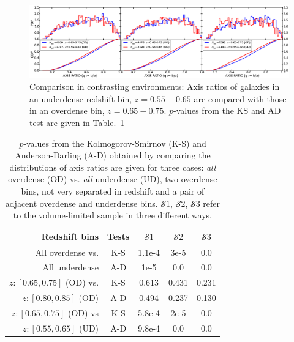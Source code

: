 \documentclass[twocolumn,useAMS,usenatbib]{mn2e}
\newcommand{\s}{\ensuremath{\mathcal{S}}}
\begin{document}
\begin{figure}
 \centering
 \includegraphics[width=2.3\columnwidth]{axis_ratio_odud}
 \caption{Comparison in contrasting environments: Axis ratios of galaxies in an underdense redshift bin, $z=0.55-0.65$ are compared with those in an overdense bin, $z=0.65-0.75$. $p$-values from the KS and AD test are given in Table.~\ref{table:pvalues_all}}
 \label{fig:axisratio_contrasting}
\end{figure}

\begin{table}
 \centering
 \begin{tabular}[\columnwidth]{ | r | c | c | c | c | }
  \hline
  Redshift bins & Tests & \s$1$ & \s$2$ & \s$3$ \\
  \hline
  All overdense vs. & K-S & 1.1e-4 & 3e-5 & 0.0 \\
  All underdense    & A-D & 1e-5 & 0.0 & 0.0 \\ \hline 
  $z:[0.65,0.75]$ (OD) vs. & K-S & 0.613 & 0.431 & 0.231 \\
  $z:[0.80,0.85]$ (OD) & A-D & 0.494 & 0.237 & 0.130 \\ \hline
  $z:[0.65,0.75]$ (OD) vs & K-S & 5.8e-4 & 2e-5 & 0.0 \\
  $z:[0.55,0.65]$ (UD) & A-D & 9.8e-4 & 0.0 & 0.0 \\ \hline
 \end{tabular}
 \caption{$p$-values from the Kolmogorov-Smirnov (K-S) and Anderson-Darling (A-D) obtained by comparing the distributions of axis ratios are given for three cases: \emph{all} overdense (OD) vs. \emph{all} underdense (UD), two overdense bins, not very separated in redshift and a pair of adjacent overdense and underdense bins. \s$1$, \s$2$, \s$3$ refer to the volume-limited sample in three different ways.}
 \label{table:pvalues_all}
\end{table}
\end{document}
